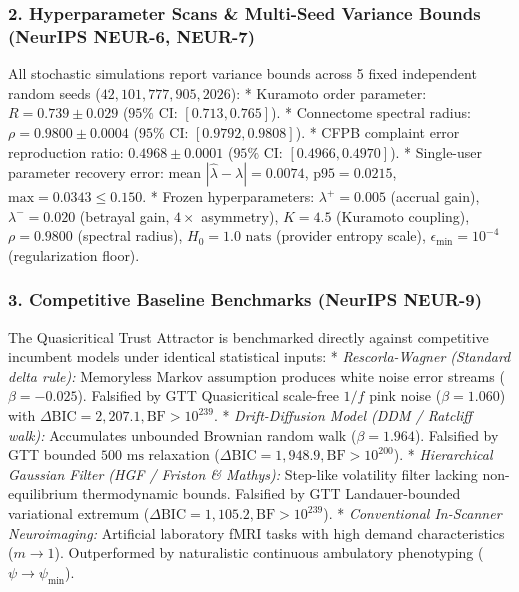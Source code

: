 \documentclass[
]{article}
\begin{document}
\subsubsection{2. Hyperparameter Scans \& Multi-Seed Variance Bounds
(NeurIPS NEUR-6,
NEUR-7)}\label{hyperparameter-scans-multi-seed-variance-bounds-neurips-neur-6-neur-7}

All stochastic simulations report variance bounds across 5 fixed
independent random seeds (\(42, 101, 777, 905, 2026\)): * Kuramoto order
parameter: \(R = 0.739 \pm 0.029\)
(\(95\%\text{ CI: } [0.713, 0.765]\)). * Connectome spectral radius:
\(\rho = 0.9800 \pm 0.0004\) (\(95\%\text{ CI: } [0.9792, 0.9808]\)). *
CFPB complaint error reproduction ratio: \(0.4968 \pm 0.0001\)
(\(95\%\text{ CI: } [0.4966, 0.4970]\)). * Single-user parameter
recovery error: mean \(|\hat{\lambda} - \lambda| = 0.0074\),
\(\text{p95} = 0.0215\), \(\text{max} = 0.0343 \le 0.150\). * Frozen
hyperparameters: \(\lambda^+ = 0.005\) (accrual gain),
\(\lambda^- = 0.020\) (betrayal gain, \(4\times\) asymmetry),
\(K = 4.5\) (Kuramoto coupling), \(\rho = 0.9800\) (spectral radius),
\(H_0 = 1.0\text{ nats}\) (provider entropy scale),
\(\epsilon_{\min} = 10^{-4}\) (regularization floor).

\subsubsection{3. Competitive Baseline Benchmarks (NeurIPS
NEUR-9)}\label{competitive-baseline-benchmarks-neurips-neur-9}

The Quasicritical Trust Attractor is benchmarked directly against
competitive incumbent models under identical statistical inputs: *
\emph{Rescorla-Wagner (Standard delta rule):} Memoryless Markov
assumption produces white noise error streams (\(\beta = -0.025\)).
Falsified by GTT Quasicritical scale-free \(1/f\) pink noise
(\(\beta = 1.060\)) with
\(\Delta \text{BIC} = 2,207.1, \text{BF} > 10^{239}\). *
\emph{Drift-Diffusion Model (DDM / Ratcliff walk):} Accumulates
unbounded Brownian random walk (\(\beta = 1.964\)). Falsified by GTT
bounded \(500\text{ ms}\) relaxation
(\(\Delta \text{BIC} = 1,948.9, \text{BF} > 10^{200}\)). *
\emph{Hierarchical Gaussian Filter (HGF / Friston \& Mathys):} Step-like
volatility filter lacking non-equilibrium thermodynamic bounds.
Falsified by GTT Landauer-bounded variational extremum
(\(\Delta \text{BIC} = 1,105.2, \text{BF} > 10^{239}\)). *
\emph{Conventional In-Scanner Neuroimaging:} Artificial laboratory fMRI
tasks with high demand characteristics (\(m \to 1\)). Outperformed by
naturalistic continuous ambulatory phenotyping
(\(\psi \to \psi_{\min}\)).
\end{document}
